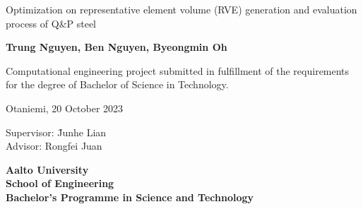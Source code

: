 {\parindent0pt %
\begin{spacing}{1.1}

 {\sffamily{}}
\end{spacing}

\vspace{15mm}

\begin{spacing}{1.4}
{\fontsize{16pt}{16pt}\selectfont Optimization on representative element volume (RVE) generation and evaluation process of Q\&P steel}
\end{spacing}

\vspace{10.6mm}

{\fontsize{13.9pt}{13.9pt}\bfseries\sffamily\lsstyle Trung Nguyen, Ben Nguyen, Byeongmin Oh}

\vfill

{\fontsize{10.3pt}{10.3pt}\sffamily\lsstyle\raggedright
\begin{spacing}{1.06}

Computational engineering project submitted in fulfillment of the requirements for the degree of Bachelor of Science in Technology.

Otaniemi, 20 October 2023

\begin{tabbing}
Supervisor:\hspace{6mm} \= Junhe Lian\\
Advisor: \> Rongfei Juan
\end{tabbing}
\vspace{-4mm}
\end{spacing}
} %

\vspace{11.5mm}

\begin{spacing}{.9}
{\bfseries\sffamily\lsstyle Aalto University \\
School of Engineering \\
Bachelor’s Programme in Science and Technology}
\end{spacing} 
} %




